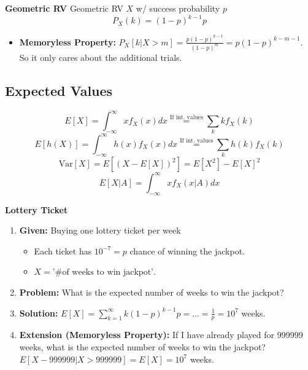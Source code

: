 \begin{example} \textbf{Geometric RV}
    Geometric RV $X$ w/ success probability $p$ 
    \begin{equation}
        P_X(k) = (1-p)^{k-1}p
    \end{equation}

    \begin{itemize}
        \item \textbf{Memoryless Property:} $P_X[k|X > m] = \frac{p(1-p)^{k-1}}{(1-p)^m} = p(1-p)^{k-m-1}$. So it only cares about the additional trials. 
    \end{itemize}
    
\end{example}

\subsection{Expected Values}
\begin{definition}
    \begin{equation}
        E[X] = \int_{-\infty}^{\infty} x f_X(x) dx \overset{\text{If int. values}}{=} \sum_{k} k f_X(k)
    \end{equation}
    \begin{equation}
        E[h(X)] = \int_{-\infty}^{\infty} h(x) f_X(x) dx \overset{\text{If int. values}}{=} \sum_{k} h(k) f_X(k)
    \end{equation}
    \begin{equation}
        \text{Var}[X] = E[(X - E[X])^2] = E[X^2] - E[X]^2
    \end{equation}
    \begin{equation}
        E[X|A] = \int_{-\infty}^{\infty} x f_{X}(x|A) dx
    \end{equation}
\end{definition}

\begin{example} \textbf{Lottery Ticket}
    \begin{enumerate}
        \item \textbf{Given:} Buying one lottery ticket per week
        \begin{itemize}
            \item Each ticket has $10^{-7} = p$ chance of winning the jackpot.
            \item $X = \text{'\# of weeks to win jackpot'}$.
        \end{itemize}
        \item \textbf{Problem:} What is the expected number of weeks to win the jackpot?
        \item \textbf{Solution:} $E[X] = \sum_{k=1}^{\infty} k(1 - p)^{k-1}p = \ldots = \frac{1}{p} = 10^7$ weeks.
        \item \textbf{Extension (Memoryless Property):} If I have already played for 999999 weeks, what is the expected number of weeks to win the jackpot? $E[X-999999|X>999999] = E[X] = 10^7$ weeks.
    \end{enumerate}
    
\end{example}


